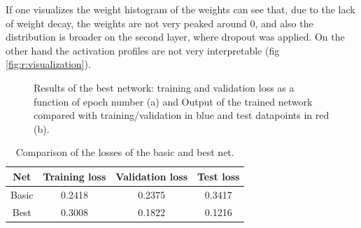 \documentclass[a4paper, 11pt]{article}
\begin{document}
    If one visualizes the weight histogram of the weights can see that, due to the lack of weight decay, the weights are not very peaked around 0, and also the distribution is broader on the second layer, where dropout was applied. On the other hand the activation profiles are not very interpretable (fig \ref{fig:r:visualization}).

    \begin{figure}
      \centering
       \quad
      \caption{Results of the best network: training and validation loss as a function of epoch number (a) and Output of the trained network compared with training/validation in blue and test datapoints in red (b).}
      \label{fig:r:best}
    \end{figure}

    \begin{table}
      \centering
      \begin{tabular}{c|ccc}
        Net & Training loss & Validation loss & Test loss \\
        \midrule
        Basic & 0.2418 & 0.2375 & 0.3417 \\
        Best & 0.3008 & 0.1822 & 0.1216
      \end{tabular}
      \caption{Comparison of the losses of the basic and best net.}
      \label{tab:r:losses}
    \end{table}
\end{document}
